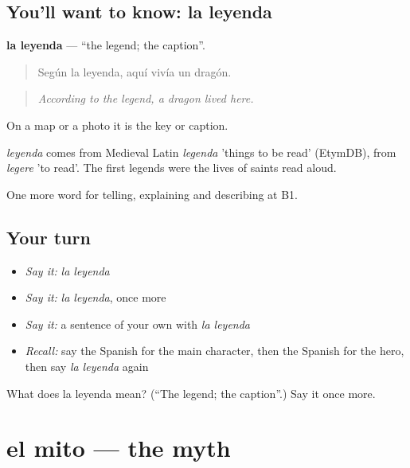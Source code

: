 \subsection*{You'll want to know: la leyenda}
\textbf{la leyenda} — \textquotedblleft{}the legend; the caption\textquotedblright{}.

\begin{quote}
Según la leyenda, aquí vivía un dragón.
\end{quote}

\begin{quote}
\emph{According to the legend, a dragon lived here.}
\end{quote}

On a map or a photo it is the key or caption.

\begin{cousinweb}
\emph{leyenda} comes from Medieval Latin \emph{legenda} 'things to be read' (EtymDB), from \emph{legere} 'to read'. The first legends were the lives of saints read aloud.
\end{cousinweb}

\begin{grammarlens}[title={What you've built}]
One more word for telling, explaining and describing at B1.
\end{grammarlens}

\subsection*{Your turn}
\begin{itemize}
\raggedright
  \item \emph{Say it:} \emph{la leyenda}
  \item \emph{Say it:} \emph{la leyenda}, once more
  \item \emph{Say it:} a sentence of your own with \emph{la leyenda}
  \item \emph{Recall:} say the Spanish for the main character, then the Spanish for the hero, then say \emph{la leyenda} again
\end{itemize}

\begin{tcolorbox}[breakable,colback=teal!4,colframe=teal!35!black,title={Before you move on}]
What does la leyenda mean? (\textquotedblleft{}The legend; the caption\textquotedblright{}.) Say it once more.
\end{tcolorbox}
\section[el mito]{el mito — the myth}

